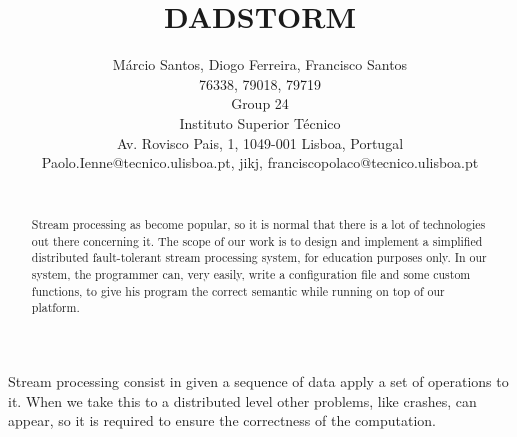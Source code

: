 \documentclass[times, 10pt,twocolumn]{article}
\begin{document}
\title{DADSTORM}

\author{Márcio Santos, Diogo Ferreira, Francisco Santos\\
76338, 79018, 79719\\Group 24\\Instituto Superior Técnico \\ Av. Rovisco Pais, 1, 1049-001 Lisboa, Portugal\\ Paolo.Ienne@tecnico.ulisboa.pt, jikj, franciscopolaco@tecnico.ulisboa.pt\\
\\}

\maketitle
\thispagestyle{empty}

\begin{abstract}
	Stream processing as become popular, so it is normal that there is a lot of technologies out there concerning it.
	The scope of our work is to design and implement a simplified distributed fault-tolerant stream processing system, for education purposes only.
	In our system, the programmer can, very easily, write a configuration file and some custom functions, to give his program the correct semantic while running on top of our platform.
\end{abstract}




Stream processing consist in given a sequence of data apply a set of operations to it. When we take
this to a distributed level other problems, like crashes, can appear, so it is required to ensure the correctness of the computation.
\end{document}
